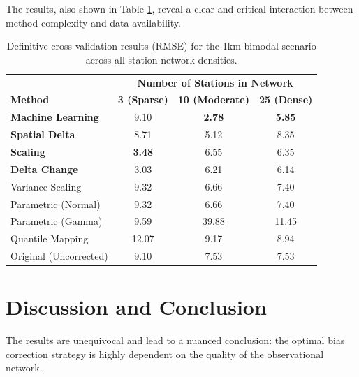 \documentclass[11pt, a4paper]{article}
\begin{document}
The results, also shown in Table \ref{tab:full_summary}, reveal a clear and critical interaction between method complexity and data availability.

\begin{table}[h!]
\centering
\caption{Definitive cross-validation results (RMSE) for the 1km bimodal scenario across all station network densities.}
\label{tab:full_summary}
\begin{tabular}{lccc}
\toprule
& \multicolumn{3}{c}{\textbf{Number of Stations in Network}} \\
\cmidrule(lr){2-4}
\textbf{Method} & \textbf{3 (Sparse)} & \textbf{10 (Moderate)} & \textbf{25 (Dense)} \\
\midrule
\textbf{Machine Learning} & 9.10 & \textbf{2.78} & \textbf{5.85} \\
\textbf{Spatial Delta} & 8.71 & 5.12 & 8.35 \\
\textbf{Scaling} & \textbf{3.48} & 6.55 & 6.35 \\
\textbf{Delta Change} & 3.03 & 6.21 & 6.14 \\
Variance Scaling & 9.32 & 6.66 & 7.40 \\
Parametric (Normal) & 9.32 & 6.66 & 7.40 \\
Parametric (Gamma) & 9.59 & 39.88 & 11.45 \\
Quantile Mapping & 12.07 & 9.17 & 8.94 \\
\midrule
Original (Uncorrected) & 9.10 & 7.53 & 7.53 \\
\bottomrule
\end{tabular}
\end{table}

\section{Discussion and Conclusion}

The results are unequivocal and lead to a nuanced conclusion: the optimal bias correction strategy is highly dependent on the quality of the observational network.
\end{document}
